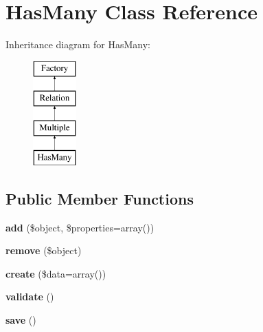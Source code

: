\hypertarget{classHasMany}{
\section{HasMany Class Reference}
\label{classHasMany}
}
Inheritance diagram for HasMany:\begin{figure}[H]
\begin{center}
\leavevmode
\includegraphics[height=4.000000cm]{classHasMany}
\end{center}
\end{figure}
\subsection*{Public Member Functions}
\begin{DoxyCompactItemize}
\item 
\hypertarget{classHasMany_abc841ae067683fab86897d65433c6308}{
{\bfseries add} (\$object, \$properties=array())}
\label{classHasMany_abc841ae067683fab86897d65433c6308}

\item 
\hypertarget{classHasMany_a532f17f33705c0bdbc5c1e6968717c53}{
{\bfseries remove} (\$object)}
\label{classHasMany_a532f17f33705c0bdbc5c1e6968717c53}

\item 
\hypertarget{classHasMany_a930f3199934c74d486cfdb9eb7305193}{
{\bfseries create} (\$data=array())}
\label{classHasMany_a930f3199934c74d486cfdb9eb7305193}

\item 
\hypertarget{classHasMany_a643f80c91f9c5cf098c7b12799cf1bb5}{
{\bfseries validate} ()}
\label{classHasMany_a643f80c91f9c5cf098c7b12799cf1bb5}

\item 
\hypertarget{classHasMany_a704515b18dfa5f0998aff185a6b1bce0}{
{\bfseries save} ()}
\label{classHasMany_a704515b18dfa5f0998aff185a6b1bce0}

\end{DoxyCompactItemize}
